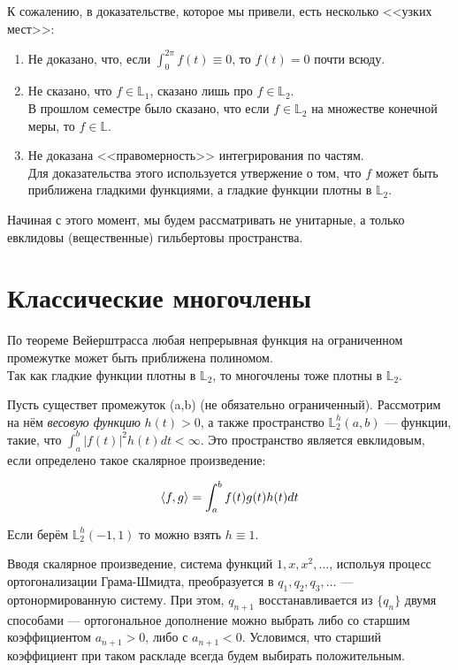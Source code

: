 \documentclass[12pt]{article}
\begin{document}
		К сожалению, в доказательстве, которое мы привели, есть несколько <<узких мест>>:
		\begin{enumerate}
			\item Не доказано, что, если $\int_0^{2\pi} f(t) \equiv 0$, то $f(t) = 0$ почти всюду.
			\item Не сказано, что $f \in \mathbb{L}_1$, сказано лишь про $f \in \mathbb{L}_2$. \\
			В прошлом семестре было сказано, что если $f \in \mathbb{L}_2$ на множестве конечной меры, то $f \in \mathbb{L}$.
			\item Не доказана <<правомерность>> интегрирования по частям. \\
			Для доказательства этого используется утвержение о том, что $f$ может быть приближена гладкими функциями, а
			гладкие функции плотны в $\mathbb{L}_2$.
		\end{enumerate}
	
		Начиная с этого момент, мы будем рассматривать не унитарные, а только евклидовы (вещественные) гильбертовы пространства.
	
		\section{Классические многочлены}
		По теореме Вейерштрасса любая непрерывная функция на ограниченном промежутке может быть приближена полиномом. \\
		Так как гладкие функции плотны в $\mathbb{L}_2$, то многочлены тоже плотны в $\mathbb{L}_2$.
	
		Пусть существет промежуток (a,b) (не обязательно ограниченный). Рассмотрим на нём \textit{весовую функцию} 
		$h(t) > 0$, а также пространство
		$\mathbb{L}_2^h (a,b)$ --- функции, такие, что $\int_a^b |f(t)|^2 h(t) dt < \infty$.
		Это пространство является евклидовым, если определено такое скалярное произведение:
	
		$$ \left\langle f, g \right\rangle = \int_a^b f(t) g(t) h(t) dt $$
	
		Если берём $\mathbb{L}_2^h (-1, 1)$ то можно взять $h \equiv 1$.
	
		Вводя скалярное произведение, система функций
		$1, x, x^2, \ldots$, испольуя процесс ортогонализации Грама-Шмидта, преобразуется в $q_1, q_2, q_3, \ldots$ --- ортонормированную 
		систему. При этом, $q_{n+1}$ восстанавливается из $ \{ q_n \} $ двумя способами --- ортогональное дополнение можно выбрать либо
		со старшим коэффициентом $a_{n+1} > 0$, либо с $a_{n+1} < 0$. Условимся, что старший коэффициент при таком раскладе всегда будем 
		выбирать положительным.
	
\end{document}
